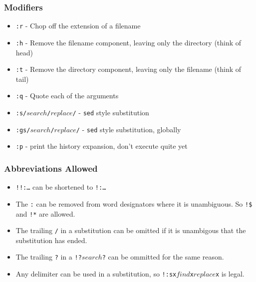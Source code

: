 \documentclass[aspectratio=1610]{beamer}
\begin{document}
\begin{frame}
    \frametitle{Modifiers}
    \begin{itemize}
        \item<2-> \texttt{:r} - Chop off the extension of a filename
        \item<3-> \texttt{:h} - Remove the filename component, leaving only the
            directory (think of head)
        \item<4-> \texttt{:t} - Remove the directory component, leaving only the
            filename (think of tail)
        \item<5-> \texttt{:q} - Quote each of the arguments
        \item<6-> \texttt{:s/$search$/$replace$/} - \texttt{sed} style substitution
        \item<7-> \texttt{:gs/$search$/$replace$/} - \texttt{sed} style
            substitution, globally
        \item<8-> \texttt{:p} - print the history expansion, don't execute quite
            yet
    \end{itemize}
\end{frame}

\begin{frame}
    \frametitle{Abbreviations Allowed}
    \begin{itemize}[<+->]
        \item \texttt{!!:\ldots} can be shortened to \texttt{!:\ldots}
        \item The \texttt{:} can be removed from word designators where it is
            unambiguous. So \texttt{!\$} and \texttt{!*} are allowed.
        \item The trailing \texttt{/} in a substitution can be omitted if it is
            unambigous that the substitution has ended.
        \item The trailing \texttt{?} in a \texttt{!?$search$?} can be ommitted
            for the same reason.
        \item Any delimiter can be used in a substitution, so
            \texttt{!:sx$find$x$replace$x} is legal.
    \end{itemize}
\end{frame}
\end{document}
